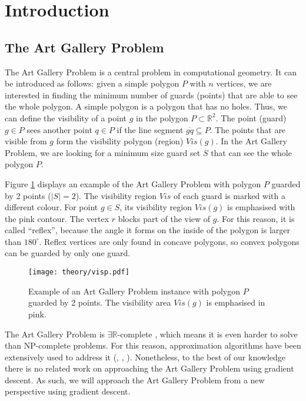 \section{Introduction}
\subsection{The Art Gallery Problem}

The Art Gallery Problem \cite{o1987art} is a central problem in computational geometry. It can be introduced as follows: given a simple polygon $P$ with $n$ vertices, we are interested in finding the minimum number of guards (points) that are able to see the whole polygon. A simple polygon is a polygon that has no holes. Thus, we can define the visibility of a point $g$ in the polygon $P \subset \mathbb R^2$. The point (guard) $g \in P$ sees another point $q \in P$ if the line segment $\overline{gq} \subseteq P$. The points that are visible from $g$ form the visibility polygon (region) $\mathit{Vis}(g)$. In the Art Gallery Problem, we are looking for a minimum size guard set $S$ that can see the whole polygon $P$.

Figure \ref{fig:art} displays an example of the Art Gallery Problem \cite{o1987art} with polygon $P$ guarded by 2 points ($|S| = 2$). The visibility region $\mathit{Vis}$ of each guard is marked with a different colour. For point $g \in S$, its visibility region $\mathit{Vis}(g)$ is emphasised with the pink contour. The vertex $r$ blocks part of the view of $g$. For this reason, it is called ``reflex'', because the angle it forms on the inside of the polygon is larger than $180^\circ$. Reflex vertices are only found in concave polygons, so convex polygons can be guarded by only one guard.

\begin{figure}[h!]
    \centering
    \texttt{[image: theory/visp.pdf]}
    \caption{Example of an Art Gallery Problem instance with polygon $P$ guarded by 2 points. The visibility area $\mathit{Vis}(g)$ is emphasised in pink.}
    \label{fig:art}
\end{figure}

The Art Gallery Problem \cite{o1987art} is $\exists \mathbb R$-complete \cite{abrahamsen2021art}, which means it is even harder to solve than NP-complete problems. For this reason, approximation algorithms have been extensively used to address it (\cite{DBLP:journals/corr/BonnetM16b}, \cite{GHOSH2010718}, \cite{DBLP:journals/corr/abs-2007-06920}). Nonetheless, to the best of our knowledge there is no related work on approaching the Art Gallery Problem \cite{o1987art} using gradient descent. As such, we will approach the Art Gallery Problem \cite{o1987art} from a new perspective using gradient descent.

